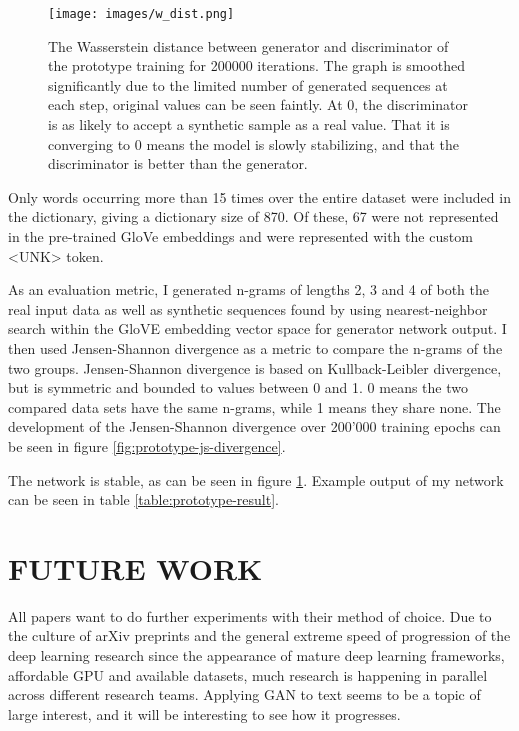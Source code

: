 \documentclass[a4paper,conference]{IEEEtran}
\begin{document}
      \begin{figure}[thpb]
      \centering
      \texttt{[image: images/w\_dist.png]}
      \caption{The Wasserstein distance between generator and discriminator of the prototype training for 200000 iterations. The graph is smoothed significantly due to the limited number of generated sequences at each step, original values can be seen faintly. At 0, the discriminator is as likely to accept a synthetic sample as a real value. That it is converging to 0 means the model is slowly stabilizing, and that the discriminator is better than the generator.}
      \label{fig:prototype-cost}
   \end{figure}

Only words occurring more than 15 times over the entire dataset were included in the dictionary, giving a dictionary size of 870. Of these, 67 were not represented in the pre-trained GloVe embeddings and were represented with the custom <UNK> token.

As an evaluation metric, I generated n-grams of lengths 2, 3 and 4 of both the real input data as well as synthetic sequences found by using nearest-neighbor search within the GloVE embedding vector space for generator network output. I then used Jensen-Shannon divergence as a metric to compare the n-grams of the two groups. Jensen-Shannon divergence is based on Kullback-Leibler divergence, but is symmetric and bounded to values between 0 and 1. 0 means the two compared data sets have the same n-grams, while 1 means they share none. The development of the Jensen-Shannon divergence over 200'000 training epochs can be seen in figure \ref{fig:prototype-js-divergence}.

The network is stable, as can be seen in figure \ref{fig:prototype-cost}. Example output of my network can be seen in table \ref{table:prototype-result}.

\section{FUTURE WORK}
All papers want to do further experiments with their method of choice. Due to the culture of arXiv preprints and the general extreme speed of progression of the deep learning research since the appearance of mature deep learning frameworks, affordable GPU and available datasets, much research is happening in parallel across different research teams. Applying GAN to text seems to be a topic of large interest, and it will be interesting to see how it progresses. 
\end{document}
